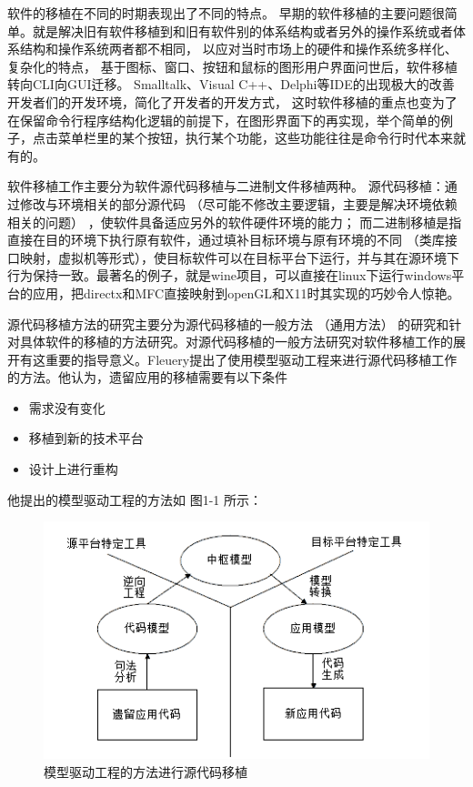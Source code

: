 软件的移植在不同的时期表现出了不同的特点。
早期的软件移植的主要问题很简单。就是解决旧有软件移植到和旧有软件别的体系结构或者另外的操作系统或者体系结构和操作系统两者都不相同，
以应对当时市场上的硬件和操作系统多样化、复杂化的特点，
基于图标、窗口、按钮和鼠标的图形用户界面问世后，软件移植转向CLI向GUI迁移。
Smalltalk、Visual C++、Delphi等IDE的出现极大的改善开发者们的开发环境，简化了开发者的开发方式，
这时软件移植的重点也变为了在保留命令行程序结构化逻辑的前提下，在图形界面下的再实现，举个简单的例子，点击菜单栏里的某个按钮，执行某个功能，这些功能往往是命令行时代本来就有的。

软件移植工作主要分为软件源代码移植与二进制文件移植两种。
源代码移植：通过修改与环境相关的部分源代码 （尽可能不修改主要逻辑，主要是解决环境依赖相关的问题） ，使软件具备适应另外的软件硬件环境的能力；
而二进制移植是指直接在目的环境下执行原有软件，通过填补目标环境与原有环境的不同 （类库接口映射，虚拟机等形式），使目标软件可以在目标平台下运行，并与其在源环境下行为保持一致。最著名的例子，就是wine项目，可以直接在linux下运行windows平台的应用，把directx和MFC直接映射到openGL和X11时其实现的巧妙令人惊艳。

源代码移植方法的研究主要分为源代码移植的一般方法 （通用方法） 的研究和针对具体软件的移植的方法研究。对源代码移植的一般方法研究对软件移植工作的展开有这重要的指导意义。Fleuery提出了使用模型驱动工程来进行源代码移植工作的方法。他认为，遗留应用的移植需要有以下条件

\begin{itemize}
    \item 需求没有变化
    \item 移植到新的技术平台
    \item 设计上进行重构
\end{itemize}

他提出的模型驱动工程的方法如 图1-1 所示：

\begin{figure}[h!] %
    \centering
    \includegraphics[width=200bp]{figure/pic/model-driving-software-porting.png}
    \caption{模型驱动工程的方法进行源代码移植}
    \label{model-driving-software-porting-sample}
\end{figure}

